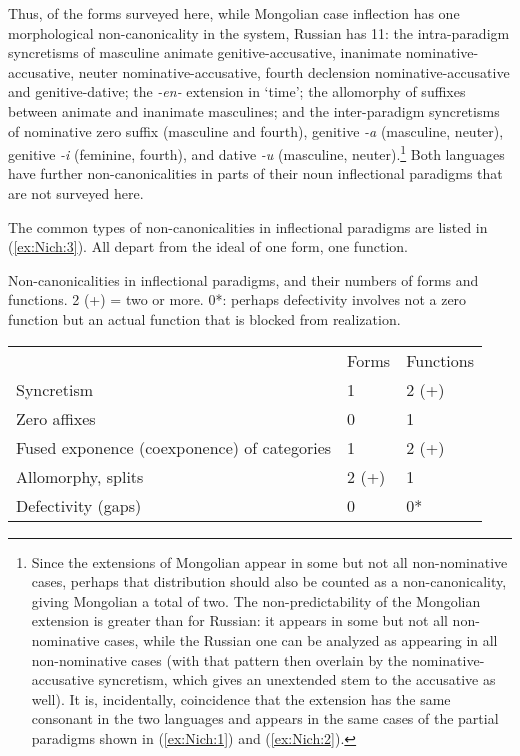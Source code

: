 \documentclass[output=collectionpaper]{langsci/langscibook}
\begin{document}
Thus, of the forms surveyed here, while Mongolian case inflection has one morphological non-canonicality in the system, Russian has 11: the intra-paradigm syncretisms of masculine animate genitive-accusative, inanimate nominative\hyp{}accusative, neuter nominative\hyp{}accusative, fourth declension nominative-accusative and genitive\hyp{}dative; the \textit{-en-} extension in `time'; the allomorphy of suffixes between animate and inanimate masculines; and the inter-paradigm syncretisms of nominative zero suffix (masculine and fourth), genitive \textit{-a} (masculine, neuter), genitive \textit{-i} (feminine, fourth), and dative \textit{-u} (masculine, neuter).\footnote{%
Since the extensions of Mongolian appear in some but not all non-nominative cases, perhaps that distribution should also be counted as a non-canonicality, giving Mongolian a total of two. The non-predictability of the Mongolian extension is greater than for Russian: it appears in some but not all non-nominative cases, while the Russian one can be analyzed as appearing in all non-nominative cases (with that pattern then overlain by the nominative-accusative syncretism, which gives an unextended stem to the accusative as well). It is, incidentally, coincidence that the extension has the same consonant in the two languages and appears in the same cases of the partial paradigms shown in (\ref{ex:Nich:1}) and (\ref{ex:Nich:2}).
} %
Both languages have further non-canonicalities in parts of their noun inflectional paradigms that are not surveyed here.

The common types of non-canonicalities in inflectional paradigms are listed in (\ref{ex:Nich:3}). All depart from the ideal of one form, one function.

\ea
\label{ex:Nich:3}
Non-canonicalities in inflectional paradigms, and their numbers of forms and functions.  2 (+) = two or more. 0*: perhaps defectivity involves not a zero function but an actual function that is blocked from realization.\\
\medskip
\begin{tabular}{lll}
						&		Forms &	Functions	\\
	Syncretism	 &					1 &	2 (+)	\\
	Zero affixes	 &					0 &	1	\\
	Fused exponence (coexponence) of categories	 &1 &	2 (+)	\\
	Allomorphy, splits		 &			2 (+)	 &1	\\
	Defectivity (gaps)		 &			0 &	0*
\end{tabular}
\z
\end{document}
